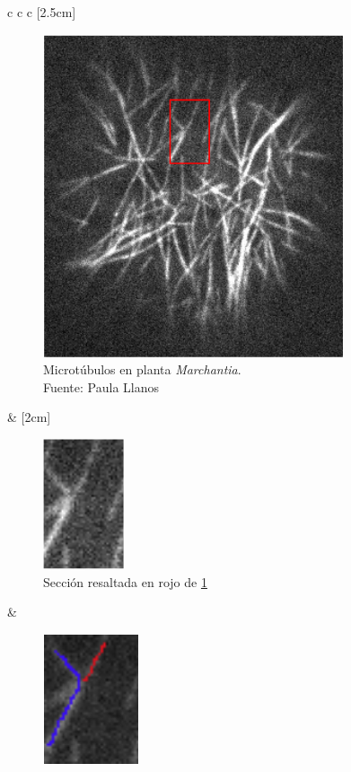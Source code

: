 \begin{figure}[h]
    \label{fig:NoConsenso}
    \begin{tabular}{c c c}
        [2.5cm]{
        \begin{subfigure}[t]{0.4\textwidth}
        \includegraphics[scale=0.5]{imagenes/NoConsenso.png}
        \caption{Microt\'ubulos en planta {\it Marchantia}.\\Fuente: Paula Llanos}
        \label{fig:NoConsensoGeneral}
        \end{subfigure}  
        }
        &
        [2cm]{
        \begin{subfigure}[t]{0.25\textwidth}
        \includegraphics[]{imagenes/NoConsenso2.png}
        \caption{Secci\'on resaltada en rojo de \ref{fig:NoConsensoGeneral}}
        \label{fig:NoConsensoRect}
        \end{subfigure}
        }
        &
        \begin{subfigure}[t]{0.21\textwidth}
        \includegraphics[scale=0.8]{imagenes/NoConsenso3.png}

\end{subfigure}
\end{tabular}
\end{figure}

